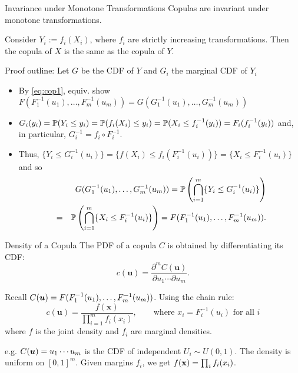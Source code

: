 \documentclass[11pt,handout,aspectratio=169]{beamer}
\begin{document}
\begin{frame}{Invariance under Monotone Transformations}
Copulas are invariant under monotone transformations. 


\begin{alertblock}{}
	Consider $Y_i := f_i(X_i)$, where $f_i$ are strictly increasing transformations. Then the copula of $X$ is the same as the copula of $Y$. 
\end{alertblock}
Proof outline: Let $G$ be the CDF of $Y$ and $G_i$ the marginal CDF of $Y_i$
    \begin{itemize}
    \item By \eqref{eq:cop1}, equiv. show $F(F_1^{-1}(u_1), \ldots, F_m^{-1}(u_m))=G(G_1^{-1}(u_1), \ldots, G_m^{-1}(u_m))$
        \item $G_i(y_i)=\P(Y_i\leq y_i)=\P(f_i(X_i)\leq y_i)=\P(X_i\leq f_i^{-1}(y_i))=F_i(f_i^{-1}(y_i))$ and, in particular, $G_i^{-1}=f_i\circ F_i^{-1}$.
        \item Thus, $\{Y_i\leq G_i^{-1}(u_i)\}=\{f(X_i)\leq f_i(F^{-1}_i(u_i))\}=\{X_i\leq F^{-1}_i(u_i)\}$ and so  
      \begin{eqnarray*}
      	&&G(G_1^{-1}(u_1),\ldots, G_m^{-1}(u_m))= \P\left(\bigcap_{i=1}^m \{Y_i\leq G^{-1}_i(u_i)\}\right)\\
      	&=&\P\left(\bigcap_{i=1}^m \{X_i\leq F^{-1}_i(u_i)\}\right)=F(F_1^{-1}(u_1), \ldots, F_m^{-1}(u_m)).
      \end{eqnarray*} 
    \end{itemize}
\end{frame}

\begin{frame}{Density of a Copula}
The PDF of a copula $C$ is obtained by differentiating its CDF:
    \[ c(\mathbf{u}) = \frac{\partial^m C(\mathbf{u})}{\partial u_1 \cdots \partial u_m}. \]
    
    Recall $C(\bs u)=F(F_1^{-1}(u_1),\ldots, F_m^{-1}(u_m))$. Using the chain rule:
    \[ c(\mathbf{u}) = \frac{f(\mathbf{x})}{\prod_{i=1}^m f_i(x_i)},\qquad \mbox{where } x_i=F_i^{-1}(u_i)\mbox{ for all }i \]
    where $f$ is the joint density and $f_i$ are marginal densities.
    \bigskip
    
    e.g. $C(\bs u)=u_1\cdots u_m$ is the CDF of independent $U_i\sim U(0,1)$. The density is uniform on $[0,1]^m$. Given margins $f_i$, we get $f(\x)=\prod_i f_i(x_i)$.
\end{frame}
\end{document}
